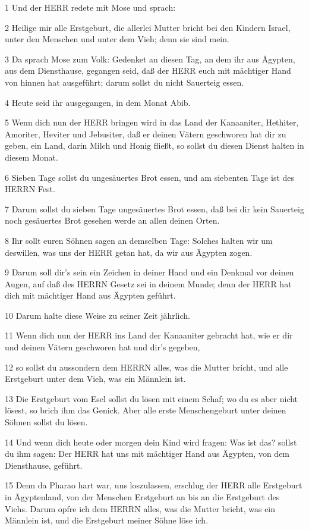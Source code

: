 \par 1 Und der HERR redete mit Mose und sprach:
\par 2 Heilige mir alle Erstgeburt, die allerlei Mutter bricht bei den Kindern Israel, unter den Menschen und unter dem Vieh; denn sie sind mein.
\par 3 Da sprach Mose zum Volk: Gedenket an diesen Tag, an dem ihr aus Ägypten, aus dem Diensthause, gegangen seid, daß der HERR euch mit mächtiger Hand von hinnen hat ausgeführt; darum sollst du nicht Sauerteig essen.
\par 4 Heute seid ihr ausgegangen, in dem Monat Abib.
\par 5 Wenn dich nun der HERR bringen wird in das Land der Kanaaniter, Hethiter, Amoriter, Heviter und Jebusiter, daß er deinen Vätern geschworen hat dir zu geben, ein Land, darin Milch und Honig fließt, so sollst du diesen Dienst halten in diesem Monat.
\par 6 Sieben Tage sollst du ungesäuertes Brot essen, und am siebenten Tage ist des HERRN Fest.
\par 7 Darum sollst du sieben Tage ungesäuertes Brot essen, daß bei dir kein Sauerteig noch gesäuertes Brot gesehen werde an allen deinen Orten.
\par 8 Ihr sollt euren Söhnen sagen an demselben Tage: Solches halten wir um deswillen, was uns der HERR getan hat, da wir aus Ägypten zogen.
\par 9 Darum soll dir's sein ein Zeichen in deiner Hand und ein Denkmal vor deinen Augen, auf daß des HERRN Gesetz sei in deinem Munde; denn der HERR hat dich mit mächtiger Hand aus Ägypten geführt.
\par 10 Darum halte diese Weise zu seiner Zeit jährlich.
\par 11 Wenn dich nun der HERR ins Land der Kanaaniter gebracht hat, wie er dir und deinen Vätern geschworen hat und dir's gegeben,
\par 12 so sollst du aussondern dem HERRN alles, was die Mutter bricht, und alle Erstgeburt unter dem Vieh, was ein Männlein ist.
\par 13 Die Erstgeburt vom Esel sollst du lösen mit einem Schaf; wo du es aber nicht lösest, so brich ihm das Genick. Aber alle erste Menschengeburt unter deinen Söhnen sollst du lösen.
\par 14 Und wenn dich heute oder morgen dein Kind wird fragen: Was ist das? sollst du ihm sagen: Der HERR hat uns mit mächtiger Hand aus Ägypten, von dem Diensthause, geführt.
\par 15 Denn da Pharao hart war, uns loszulassen, erschlug der HERR alle Erstgeburt in Ägyptenland, von der Menschen Erstgeburt an bis an die Erstgeburt des Viehs. Darum opfre ich dem HERRN alles, was die Mutter bricht, was ein Männlein ist, und die Erstgeburt meiner Söhne löse ich.
